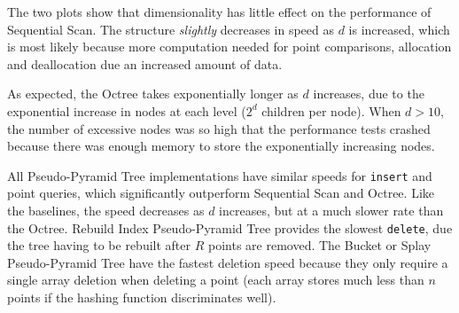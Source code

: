 The two plots show that dimensionality has little effect on the performance of Sequential Scan. The structure \textit{slightly} decreases in speed as $d$ is increased, which is most likely because more computation needed for point comparisons, allocation and deallocation due an increased amount of data.

As expected, the Octree takes exponentially longer as $d$ increases, due to the exponential increase in nodes at each level ($2^d$ children per node). When $d > 10$, the number of excessive nodes was so high that the performance tests crashed because there was enough memory to store the exponentially increasing nodes.

All Pseudo-Pyramid Tree implementations have similar speeds for \texttt{insert} and point queries, which significantly outperform Sequential Scan and Octree. Like the baselines, the speed decreases as $d$ increases, but at a much slower rate than the Octree. Rebuild Index Pseudo-Pyramid Tree provides the slowest \texttt{delete}, due the tree having to be rebuilt after $R$ points are removed. The Bucket or Splay Pseudo-Pyramid Tree have the fastest deletion speed because they only require a single array deletion when deleting a point (each array stores much less than $n$ points if the hashing function discriminates well).

